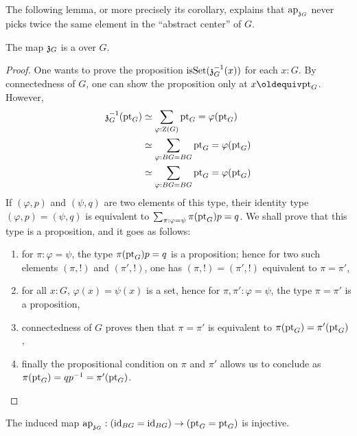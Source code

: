 The following lemma, or more precisely its corollary, explains that
$\mathop{\mathrm{ap}_{\mathfrak z_{{G}}}}$ never picks twice the same element in the
``abstract center'' of $G$.
\begin{lemma}
  \label{lemma:center-is-subgroup}%
  The map $\mathfrak z_{{G}}$ is a \covering over $G$. 
\end{lemma}
\begin{proof}
  One wants to prove the proposition
  $\mathrm{isSet}(\mathfrak z_{{G}}^{-1}(x))$ for each $x:G$. By connectedness
  of $G$, one can show the proposition only at $x\jdeq
  \pt_G$. However,
  \begin{displaymath}
    \begin{aligned}
      \mathfrak z_{{G}}^{-1}(\mathrm{pt}_G) &\simeq \sum_{\varphi:\operatorname{Z}(G)}{\mathrm{pt}_G = \varphi(\mathrm{pt}_G)}
      \\
      &\simeq \sum_{\varphi:BG=BG}{\mathrm{pt}_G = \varphi(\mathrm{pt}_G)}
      \\
      &\simeq \sum_{\varphi:BG=BG}{\mathrm{pt}_G = \varphi(\mathrm{pt}_G)}
    \end{aligned}
  \end{displaymath}
  If $(\varphi,p)$ and $(\psi,q)$ are two elements of this type, their
  identity type $(\varphi,p)=(\psi,q)$ is equivalent to
  $\sum_{\pi:\varphi=\psi}\pi(\mathrm{pt}_G) p = q$. We shall prove that this
  type is a proposition, and it goes as follows:
  \begin{enumerate}
  \item for $\pi:\varphi=\psi$, the type $\pi(\mathrm{pt}_G) p = q$ is a
    proposition; hence for two such elements $(\pi,!)$ and $(\pi',!)$,
    one has $(\pi,!)=(\pi',!)$ equivalent to $\pi=\pi'$,
  \item for all $x:G$, $\varphi(x)=\psi(x)$ is a set, hence for
    $\pi,\pi':\varphi=\psi$, the type $\pi=\pi'$ is a proposition,
  \item connectedness of $G$ proves then that $\pi=\pi'$ is equivalent
    to $\pi(\mathrm{pt}_G)=\pi'(\mathrm{pt}_G)$,
  \item finally the propositional condition on $\pi$ and $\pi'$ allows
    us to conclude as $\pi(\mathrm{pt}_G)= qp^{-1} = \pi'(\mathrm{pt}_G)$.
  \end{enumerate} 
\end{proof}

\begin{corollary}
  \label{lemma:center-inc-inj-on-paths}%
  The induced map
  $\mathop{\mathrm{ap}_{\mathfrak z_{{G}}}}: (\mathord{\mathrm{id}}_{BG}=\mathord{\mathrm{id}}_{BG}) \to (\mathrm{pt}_G = \mathrm{pt}_G)$ is
  injective.
\end{corollary}

